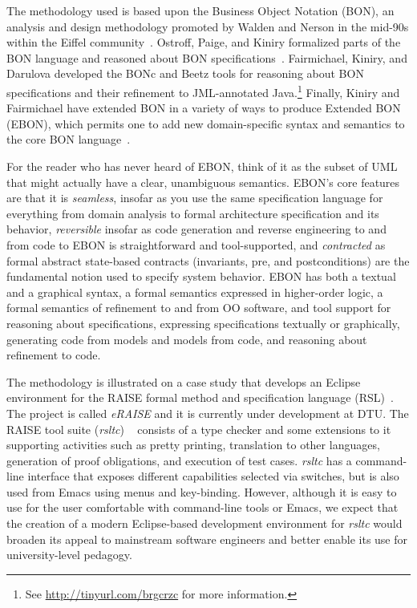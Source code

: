 \documentclass[conference]{IEEEtran}
\begin{document}
The methodology used is based upon the Business Object Notation (BON),
an analysis and design methodology promoted by Walden and Nerson in
the mid-90s within the Eiffel community~\cite{WaldenNerson95}.
Ostroff, Paige, and Kiniry formalized parts of the BON language and
reasoned about BON
specifications~\cite{LancaricOstroffPaige02,EBON01,PaigeEtal02,PaigeOstroff01b}.
Fairmichael, Kiniry, and Darulova developed the BONc and Beetz tools
for reasoning about BON specifications and their refinement to
JML-annotated Java.\footnote{See \url{http://tinyurl.com/brgcrzc} for
  more information.}  Finally, Kiniry and Fairmichael have extended
BON in a variety of ways to produce Extended BON (EBON), which permits
one to add new domain-specific syntax and semantics to the core BON
language~\cite{Kiniry02-PhDThesis}.

For the reader who has never heard of EBON, think of it as the subset
of UML that might actually have a clear, unambiguous semantics.
EBON's core features are that it is \emph{seamless}, insofar as you
use the same specification language for everything from domain
analysis to formal architecture specification and its behavior,
\emph{reversible} insofar as code generation and reverse engineering
to and from code to EBON is straightforward and tool-supported, and
\emph{contracted} as formal abstract state-based contracts
(invariants, pre, and postconditions) are the fundamental notion used
to specify system behavior.  EBON has both a textual and a graphical
syntax, a formal semantics expressed in higher-order logic, a formal
semantics of refinement to and from OO software, and tool support for
reasoning about specifications, expressing specifications textually or
graphically, generating code from models and models from code, and
reasoning about refinement to code.

The methodology is illustrated on a case study that develops an
Eclipse environment for the RAISE formal method %
and specification language (RSL)~\cite{RLG92}. The project is called
\emph{eRAISE} and it is currently under development at DTU.
The RAISE tool suite (\emph{rsltc}) ~\cite{rsltcUserGuide,RAISETools2003}
consists of a type checker and some extensions to it supporting
activities such as pretty printing, %
translation to other languages, generation of proof obligations,
and execution of test cases.
\emph{rsltc} has a command-line interface that exposes different
capabilities selected via switches, but is also used from Emacs using
menus and key-binding. However, although it is easy to use for the
user comfortable with command-line tools or Emacs, we expect that the
creation of a modern Eclipse-based development environment for
\emph{rsltc} would broaden its appeal to mainstream software engineers
and better enable its use for university-level pedagogy.
\end{document}
